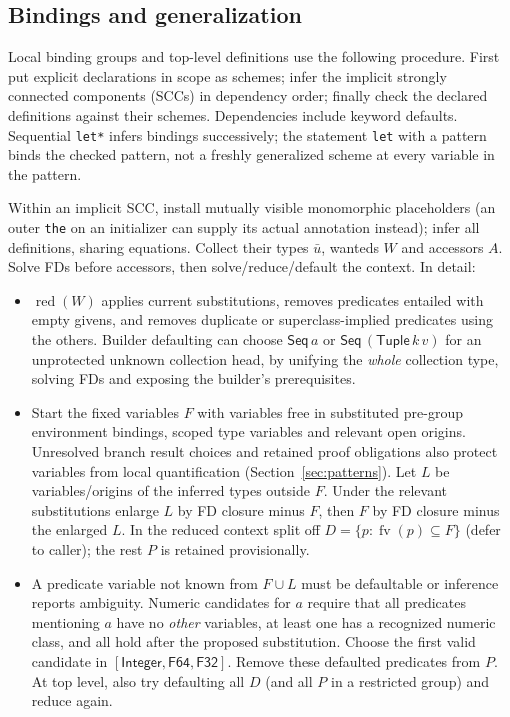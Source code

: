 \documentclass[11pt]{article}
\theoremstyle{definition}
\newcommand{\code}[1]{\texttt{#1}}
\newcommand{\fv}{\operatorname{fv}}
\newcommand{\Int}{\mathsf{Integer}}
\begin{document}
\subsection{Bindings and generalization}\label{sec:gen}
Local binding groups and top-level definitions use the following procedure.
First put explicit declarations in scope as schemes; infer the implicit
strongly connected components (SCCs) in dependency order; finally check
the declared definitions against their schemes. Dependencies include
keyword defaults. Sequential \code{let*} infers bindings successively;
the statement \code{let} with a pattern binds the checked pattern, not a
freshly generalized scheme at every variable in the pattern.

Within an implicit SCC, install mutually visible monomorphic placeholders
(an outer \code{the} on an initializer can supply its actual annotation
instead); infer all definitions, sharing equations. Collect their types
$\bar u$, wanteds $W$ and accessors $A$. Solve FDs before accessors,
then solve/reduce/default the context. In detail:
\begin{itemize}
\item $\operatorname{red}(W)$ applies current substitutions, removes
predicates entailed with empty givens, and removes duplicate or
superclass-implied predicates using the others. Builder defaulting can
choose $\mathsf{Seq}\,a$ or $\mathsf{Seq}\,(\mathsf{Tuple}\,k\,v)$ for
an unprotected unknown collection head, by unifying the \emph{whole}
collection type, solving FDs and exposing the builder's prerequisites.
\item Start the fixed variables $F$ with variables free in substituted
pre-group environment bindings, scoped type variables and relevant open
origins. Unresolved branch result choices and retained proof obligations
also protect variables from local quantification (Section~\ref{sec:patterns}).
Let $L$ be variables/origins of the inferred types outside $F$. Under the
relevant substitutions enlarge $L$ by FD closure minus $F$, then $F$ by
FD closure minus the enlarged $L$. In the reduced context split off
$D=\{p:\fv(p)\subseteq F\}$ (defer to caller); the rest $P$ is retained
provisionally.
\item A predicate variable not known from $F\cup L$ must be defaultable or
inference reports ambiguity. Numeric candidates for $a$ require that all
predicates mentioning $a$ have no \emph{other} variables, at least one has
a recognized numeric class, and all hold after the proposed substitution.
Choose the first valid candidate in $[\Int,\mathsf{F64},\mathsf{F32}]$.
Remove these defaulted predicates from $P$. At top level, also try defaulting
all $D$ (and all $P$ in a restricted group) and reduce again.
\end{itemize}
\end{document}
